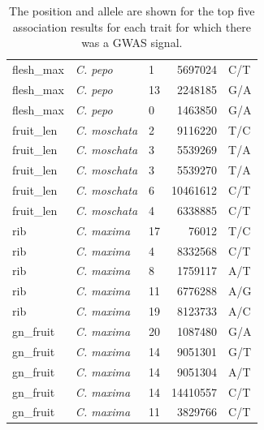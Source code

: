 \documentclass[utf8]{frontiers_suppmat} %
\begin{document}
\begin{table}[ht]
\begin{tabular}{lllrl}
		flesh\_max & \textit{C. pepo} & 1 & 5697024 & C/T \\ 
		flesh\_max & \textit{C. pepo} & 13 & 2248185 & G/A \\ 
		flesh\_max & \textit{C. pepo} & 0 & 1463850 & G/A \\ 
		fruit\_len & \textit{C. moschata}& 2 & 9116220 & T/C \\ 
		fruit\_len & \textit{C. moschata} & 3 & 5539269 & T/A \\ 
		fruit\_len & \textit{C. moschata} & 3 & 5539270 & T/A \\ 
		fruit\_len & \textit{C. moschata} & 6 & 10461612 & C/T \\ 
		fruit\_len & \textit{C. moschata} & 4 & 6338885 & C/T \\ 
		rib & \textit{C. maxima} & 17 & 76012 & T/C \\ 
		rib & \textit{C. maxima} & 4 & 8332568 & C/T \\ 
		rib & \textit{C. maxima} & 8 & 1759117 & A/T \\ 
		rib & \textit{C. maxima} & 11 & 6776288 & A/G \\ 
		rib & \textit{C. maxima} & 19 & 8123733 & A/C \\ 
		gn\_fruit & \textit{C. maxima} & 20 & 1087480 & G/A \\ 
		gn\_fruit & \textit{C. maxima} & 14 & 9051301 & G/T \\ 
		gn\_fruit & \textit{C. maxima} & 14 & 9051304 & A/T \\ 
		gn\_fruit & \textit{C. maxima} & 14 & 14410557 & C/T \\ 
		gn\_fruit & \textit{C. maxima} & 11 & 3829766 & C/T \\ 
		\hline
	\end{tabular}
	\caption{The position and allele are shown for the top five association results for each trait for which there was a GWAS signal.}
\end{table}
\end{document}
